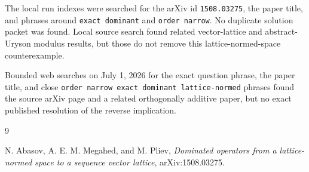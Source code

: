 \documentclass[11pt]{article}
\begin{document}
The local run indexes were searched for the arXiv id \texttt{1508.03275}, the
paper title, and phrases around \texttt{exact dominant} and
\texttt{order narrow}.  No duplicate solution packet was found.  Local source
search found related vector-lattice and abstract-Uryson modulus results, but
those do not remove this lattice-normed-space counterexample.

Bounded web searches on July 1, 2026 for the exact question phrase, the paper
title, and close \texttt{order narrow exact dominant lattice-normed} phrases
found the source arXiv page and a related orthogonally additive paper, but no
exact published resolution of the reverse implication.

\begin{thebibliography}{9}

N. Abasov, A. E. M. Megahed, and M. Pliev,
\emph{Dominated operators from a lattice-normed space to a sequence vector
lattice},
arXiv:1508.03275.

\end{thebibliography}
\end{document}
